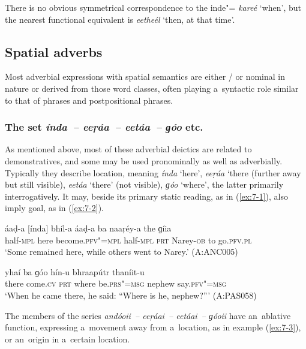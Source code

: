 There is no obvious symmetrical correspondence to the inde"=  \textit{kareé} `when', but the nearest functional equivalent is \textit{eetheél} `then, at that time'. 

\subsection{Spatial adverbs}
\label{subsec:7-1-2}

Most adverbial expressions with spatial semantics are either / or nominal in nature or derived from those word classes, often playing a~syntactic role similar to that of  phrases and postpositional phrases.

\subsubsection*{The  set \textit{índa~-- eeṛáa~-- eetáa~-- ɡóo} etc.}

As mentioned above, most of these adverbial deictics are related to demonstratives, and some may be
used pronominally as well as adverbially. Typically they describe location, meaning
\textit{índa} `here', \textit{eeṛáa} `there (further away but still visible),
\textit{eetáa} `there' (not visible), \textit{ɡóo} `where', the latter primarily
interrogatively. It may, beside its primary static reading, as in (\ref{ex:7-1}), also imply goal, as in
(\ref{ex:7-2}).

\begin{exe}
\ex
\label{ex:7-1}
\gll áaḍ-a [índa] bhíl-a áaḍ-a ba naaṛéy-a  the ɡíia \\
half-\textsc{mpl} here become.\textsc{pfv"=mpl} half-\textsc{mpl} \textsc{prt} Narey-\textsc{ob}  to  go.\textsc{pfv.pl}  \\
\glt `Some remained here, while others went to Narey.' (A:ANC005)

\ex
\label{ex:7-2}
\gll [táa] yhaí ba ɡóo hín-u bhraapútr  thaníit-u \\
there come.\textsc{cv} \textsc{prt} where be.\textsc{prs"=msg} nephew  say.\textsc{pfv"=msg} \\
\glt `When he came there, he said: ``Where is he, nephew?''' (A:PAS058)
\end{exe}
The members of the series \textit{andóoii~-- eeṛáai~-- eetáai~-- ɡóoii} have an~ablative function,
expressing a~movement away from a~location, as in example (\ref{ex:7-3}), or an~origin in a~certain
location.

